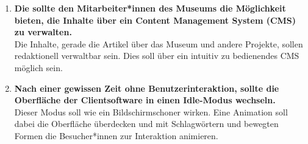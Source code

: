 \begin{enumerate}[label=\textbf{FA\arabic*}]
  \item\label{fa7} \textbf{Die \shst{} sollte den Mitarbeiter*innen des Museums die Möglichkeit bieten, die Inhalte über ein Content
  Management System (CMS) zu verwalten.}\\
  Die Inhalte, gerade die Artikel über das Museum und andere Projekte, sollen redaktionell verwaltbar sein. Dies soll über ein 
  intuitiv zu bedienendes CMS möglich sein. 
  \item\label{fa8} \textbf{Nach einer gewissen Zeit ohne Benutzerinteraktion, sollte die Oberfläche der Clientsoftware in einen
  Idle-Modus wechseln.}\\
  Dieser Modus soll wie ein Bildschirmschoner wirken. Eine Animation soll dabei die Oberfläche überdecken und mit Schlagwörtern 
  und bewegten Formen die Besucher*innen zur Interaktion animieren. 
\end{enumerate}
